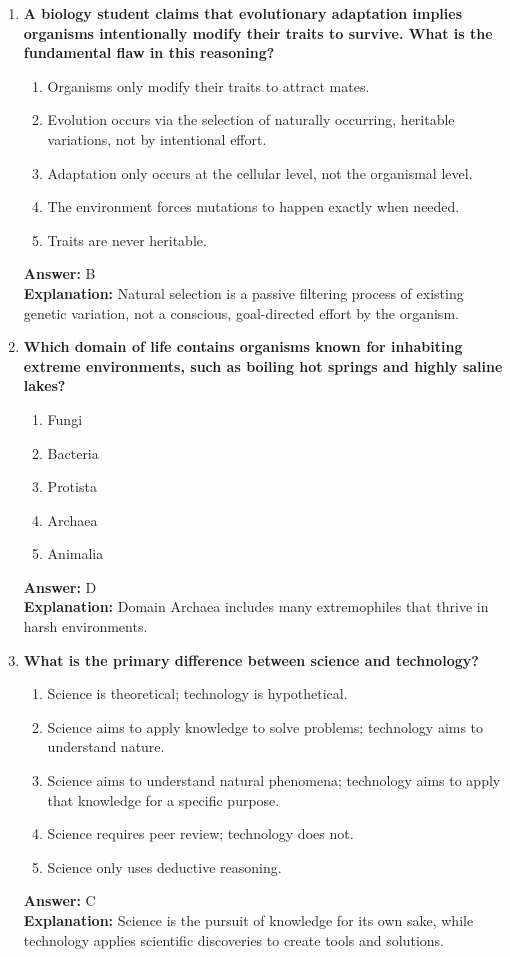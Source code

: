 \documentclass[11pt, a4paper]{article}
\begin{document}
\begin{enumerate}
\item \textbf{A biology student claims that evolutionary adaptation implies organisms intentionally modify their traits to survive. What is the fundamental flaw in this reasoning?}
\begin{enumerate}[label=\Alph*.]
    \item Organisms only modify their traits to attract mates.
    \item Evolution occurs via the selection of naturally occurring, heritable variations, not by intentional effort.
    \item Adaptation only occurs at the cellular level, not the organismal level.
    \item The environment forces mutations to happen exactly when needed.
    \item Traits are never heritable.
\end{enumerate}
\textbf{Answer:} B \\
\textbf{Explanation:} Natural selection is a passive filtering process of existing genetic variation, not a conscious, goal-directed effort by the organism.

\item \textbf{Which domain of life contains organisms known for inhabiting extreme environments, such as boiling hot springs and highly saline lakes?}
\begin{enumerate}[label=\Alph*.]
    \item Fungi
    \item Bacteria
    \item Protista
    \item Archaea
    \item Animalia
\end{enumerate}
\textbf{Answer:} D \\
\textbf{Explanation:} Domain Archaea includes many extremophiles that thrive in harsh environments.

\item \textbf{What is the primary difference between science and technology?}
\begin{enumerate}[label=\Alph*.]
    \item Science is theoretical; technology is hypothetical.
    \item Science aims to apply knowledge to solve problems; technology aims to understand nature.
    \item Science aims to understand natural phenomena; technology aims to apply that knowledge for a specific purpose.
    \item Science requires peer review; technology does not.
    \item Science only uses deductive reasoning.
\end{enumerate}
\textbf{Answer:} C \\
\textbf{Explanation:} Science is the pursuit of knowledge for its own sake, while technology applies scientific discoveries to create tools and solutions.


\end{enumerate}
\end{document}
